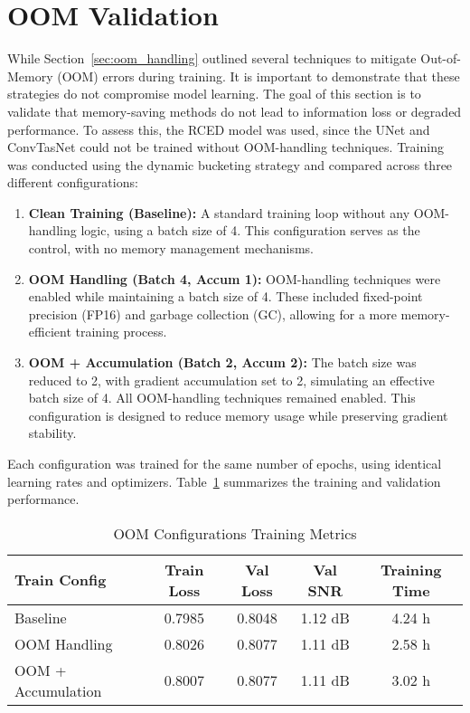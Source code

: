 \section{OOM Validation}
\label{sec:oom_validation}

While Section~\ref{sec:oom_handling} outlined several techniques to mitigate Out-of-Memory (OOM) errors during training. It is important to demonstrate that these strategies do not compromise model learning. The goal of this section is to validate that memory-saving methods do not lead to information loss or degraded performance. To assess this, the RCED model was used, since the UNet and ConvTasNet could not be trained without OOM-handling techniques. Training was conducted using the dynamic bucketing strategy and compared across three different configurations:

\begin{enumerate}
    \item \textbf{Clean Training (Baseline):} A standard training loop without any OOM-handling logic, using a batch size of 4. This configuration serves as the control, with no memory management mechanisms.
    
    \item \textbf{OOM Handling (Batch 4, Accum 1):} OOM-handling techniques were enabled while maintaining a batch size of 4. These included fixed-point precision (FP16) and garbage collection (GC), allowing for a more memory-efficient training process.
    
    \item \textbf{OOM + Accumulation (Batch 2, Accum 2):} The batch size was reduced to 2, with gradient accumulation set to 2, simulating an effective batch size of 4. All OOM-handling techniques remained enabled. This configuration is designed to reduce memory usage while preserving gradient stability.
\end{enumerate}

Each configuration was trained for the same number of epochs, using identical learning rates and optimizers. Table~\ref{tab:oom_training} summarizes the training and validation performance.

\vspace{1em}
\begin{table}[H]
\centering
\caption{OOM Configurations Training Metrics}
\label{tab:oom_training}
\begin{tabular}{|l|c|c|c|c|}
\hline
\textbf{Train Config} & \textbf{Train Loss} & \textbf{Val Loss} & \textbf{Val SNR} & \textbf{Training Time} \\
\hline
Baseline               & 0.7985 & 0.8048 & 1.12 dB & 4.24 h \\
OOM Handling           & 0.8026 & 0.8077 & 1.11 dB & 2.58 h \\
OOM + Accumulation     & 0.8007 & 0.8077 & 1.11 dB & 3.02 h \\
\hline
\end{tabular}
\end{table}


